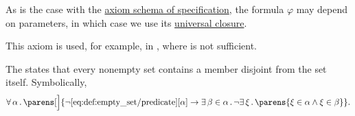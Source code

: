 \begin{definition}
\begin{thmenum}
    As is the case with the \hyperref[def:zfc/specification]{axiom schema of specification}, the formula \( \varphi \) may depend on parameters, in which case we use its \hyperref[thm:implicit_universal_quantification]{universal closure}.

    This axiom is used, for example, in , where  is not sufficient.

     The  states that every nonempty set contains a member disjoint from the set itself. Symbolically,
    \begin{equation}\label{eq:def:zfc/foundation}
      \qforall \alpha \parens[\Big]
        {
          \neg \ref{eq:def:empty_set/predicate}[\alpha]
          \rightarrow
          \qexists {\beta \in \alpha} \neg \qexists \xi \parens{ \xi \in \alpha \wedge \xi \in \beta }
        }.
    \end{equation}
  \end{thmenum}
\end{definition}

